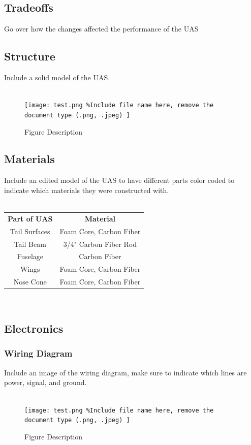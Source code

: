 \documentclass{article}
\begin{document}
\subsection*{Tradeoffs}
Go over how the changes affected the performance of the UAS

\subsection*{Structure}
Include a solid model of the UAS. \\ \\
\begin{figure}[H]
	\texttt{[image: test.png \%Include file name here, remove the document type (.png, .jpeg)
	]}
	\caption{Figure Description}
\end{figure}

\subsection*{Materials}
Include an edited model of the UAS to have different parts color coded to indicate which materials they were constructed with. \\ \\

\begin{tabular}{ c c }
	\textbf{Part of UAS} & \textbf{Material}  \\ 
	 Tail Surfaces & Foam Core, Carbon Fiber  \\  
	 Tail Beam & 3/4" Carbon Fiber Rod  \\ 
	 Fuselage & Carbon Fiber  \\  
	 Wings & Foam Core, Carbon Fiber  \\  
	 Nose Cone & Foam Core, Carbon Fiber  \\  
\end{tabular} \\

\subsection*{Electronics}
\subsubsection*{Wiring Diagram}
Include an image of the wiring diagram, make sure to indicate which lines are power, signal, and ground. \\ \\
\begin{figure}[H]
	\texttt{[image: test.png \%Include file name here, remove the document type (.png, .jpeg)
	]}
	\caption{Figure Description}
\end{figure}
\end{document}
